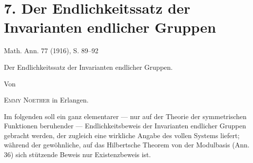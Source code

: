 \section*{7. Der Endlichkeitssatz der Invarianten endlicher Gruppen}
\begin{center}
Math. Ann. 77 (1916), S. 89--92
\end{center}

\begin{center}
{\Large Der Endlichkeitssatz der Invarianten endlicher Gruppen.}\par
\vspace{1.2em}
Von\par
\vspace{0.8em}
{\scshape Emmy Noether} in Erlangen.
\end{center}

Im folgenden soll ein ganz elementarer --- nur auf der Theorie der symmetrischen Funktionen beruhender --- Endlichkeitsbeweis der Invarianten endlicher Gruppen gebracht werden, der zugleich eine wirkliche Angabe des vollen Systems liefert; während der gewöhnliche, auf das Hilbertsche Theorem von der Modulbasis (Ann. 36) sich stützende Beweis nur Existenzbeweis ist.
